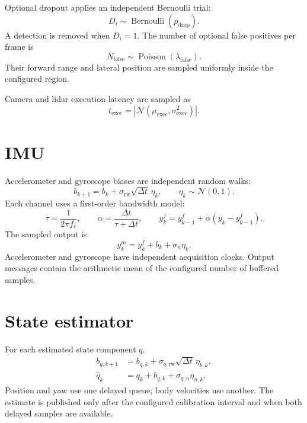 \documentclass[11pt,a4paper]{article}
\newcommand{\Normal}{\mathcal{N}}
\begin{document}
Optional dropout applies an independent Bernoulli trial:
\begin{equation}
  D_i\sim\operatorname{Bernoulli}(p_{\mathrm{drop}}).
\end{equation}
A detection is removed when \(D_i=1\). The number of optional false positives
per frame is
\begin{equation}
  N_{\mathrm{false}}\sim\operatorname{Poisson}(\lambda_{\mathrm{false}}).
\end{equation}
Their forward range and lateral position are sampled uniformly inside the
configured region.

Camera and lidar execution latency are sampled as
\begin{equation}
  t_{\mathrm{exec}}=
  \left|\Normal(\mu_{\mathrm{exec}},\sigma_{\mathrm{exec}}^2)\right|.
\end{equation}

\section{IMU}

Accelerometer and gyroscope biases are independent random walks:
\begin{equation}
  b_{k+1}=b_k+\sigma_{\mathrm{rw}}\sqrt{\Delta t}\,\eta_k,
  \qquad \eta_k\sim\Normal(0,1).
\end{equation}
Each channel uses a first-order bandwidth model:
\begin{equation}
  \tau=\frac{1}{2\pi f_c},\qquad
  \alpha=\frac{\Delta t}{\tau+\Delta t},\qquad
  y_k^f=y_{k-1}^f+\alpha(y_k-y_{k-1}^f).
\end{equation}
The sampled output is
\begin{equation}
  y_k^{m}=y_k^f+b_k+\sigma_n\eta_k.
\end{equation}
Accelerometer and gyroscope have independent acquisition clocks. Output
messages contain the arithmetic mean of the configured number of buffered
samples.

\section{State estimator}

For each estimated state component \(q\),
\begin{align}
  b_{q,k+1}&=b_{q,k}+\sigma_{q,\mathrm{rw}}
  \sqrt{\Delta t}\,\eta_{b,k},\\
  \hat q_k&=q_k+b_{q,k}+\sigma_{q,n}\eta_{n,k}.
\end{align}
Position and yaw use one delayed queue; body velocities use another. The
estimate is published only after the configured calibration interval and when
both delayed samples are available.
\end{document}
